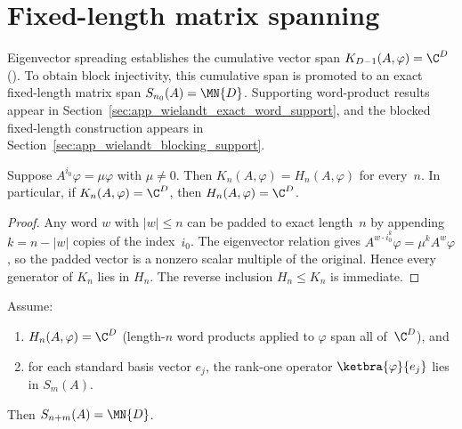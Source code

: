 \section{Fixed-length matrix spanning}\label{sec:lemma2b}

Eigenvector spreading establishes the cumulative vector span
$K_{D-1}(A,\varphi)=\C^D$ (\cite[Lemma~2(a)]{Sanz2010Quantum}).
To obtain block injectivity, this cumulative span is promoted to an exact
fixed-length matrix span $S_{n_0}(A)=\MN{D}$.
Supporting word-product results appear in
Section~\ref{sec:app_wielandt_exact_word_support}, and the blocked fixed-length
construction appears in Section~\ref{sec:app_wielandt_blocking_support}.

\begin{lemma}\label{lem:eigenvector_padding}
    \leanok
    Suppose $A^{i_0}\varphi=\mu\varphi$ with $\mu\neq0$.
    Then $K_n(A,\varphi)=H_n(A,\varphi)$ for every~$n$.
    In particular, if $K_n(A,\varphi)=\C^D$, then
    $H_n(A,\varphi)=\C^D$.
\end{lemma}

\begin{proof}
    \leanok
    Any word $w$ with $|w|\le n$ can be padded to exact
    length~$n$ by appending $k=n-|w|$ copies of the index~$i_0$.
    The eigenvector relation gives
    $A^{w\cdot i_0^k}\varphi=\mu^kA^w\varphi$, so the padded vector is a
    nonzero scalar multiple of the original.
    Hence every generator of $K_n$ lies in $H_n$.
    The reverse inclusion $H_n\le K_n$ is immediate.
\end{proof}

\begin{lemma}%
    \label{thm:lemma2b_assembly}
    \leanok
    Assume:
    \begin{enumerate}
        \item $H_n(A,\varphi)=\C^D$
              (length-$n$ word products applied to $\varphi$
              span all of~$\C^D$), and
        \item for each standard basis vector $e_j$, the rank-one operator
              $\ketbra{\varphi}{e_j}$ lies in $S_m(A)$.
    \end{enumerate}
    Then $S_{n+m}(A)=\MN{D}$.
\end{lemma}

